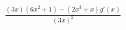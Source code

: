 \documentclass[preview]{standalone}
\begin{document}
\begin{align*}
\frac{(3x)(6x^2+1)-(2x^3+x)g'(x)}{(3x)^2}
\end{align*}
\end{document}
